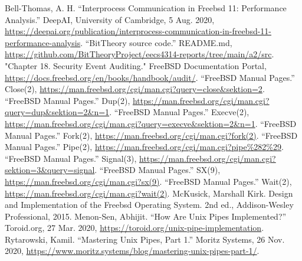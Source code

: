 \documentclass[12pt, dvipsnames, a4paper]{article}
\begin{document}
\begin{thebibliography}{00}
	 Bell-Thomas, A. H. “Interprocess Communication in Freebsd 11: Performance Analysis.” DeepAI, University of Cambridge, 5 Aug. 2020, \href{https://deepai.org/publication/interprocess-communication-in-freebsd-11-performance-analysis}{https://deepai.org/publication/interprocess-communication-in-freebsd-11-performance-analysis}.
	 “BitTheory source code.” README.md, \href{https://github.com/BitTheoryProject/eecs4314-reports/tree/main/a2/src}{https://github.com/BitTheoryProject/eecs4314-reports/tree/main/a2/src}.
	 "Chapter 18. Security Event Auditing." FreeBSD Documentation Portal, \href{https://docs.freebsd.org/en/books/handbook/audit/}{https://docs.freebsd.org/en/books/handbook/audit/}.
	 “FreeBSD Manual Pages.” Close(2), \href{https://man.freebsd.org/cgi/man.cgi?query=close\&sektion=2}{https://man.freebsd.org/cgi/man.cgi?query=close\&sektion=2}.
	 “FreeBSD Manual Pages.” Dup(2), \href{https://man.freebsd.org/cgi/man.cgi?query=dup\&sektion=2\&n=1}{https://man.freebsd.org/cgi/man.cgi?query=dup\&sektion=2\&n=1}.
	 “FreeBSD Manual Pages.” Execve(2), \href{https://man.freebsd.org/cgi/man.cgi?query=execve\&sektion=2\&n=1}{https://man.freebsd.org/cgi/man.cgi?query=execve\&sektion=2\&n=1}.
	 “FreeBSD Manual Pages.” Fork(2), \href{https://man.freebsd.org/cgi/man.cgi?fork(2)}{https://man.freebsd.org/cgi/man.cgi?fork(2)}.
	 “FreeBSD Manual Pages.” Pipe(2), \href{https://man.freebsd.org/cgi/man.cgi?pipe\%282\%29}{https://man.freebsd.org/cgi/man.cgi?pipe\%282\%29}.
	 “FreeBSD Manual Pages.” Signal(3), \href{https://man.freebsd.org/cgi/man.cgi?sektion=3\&query=signal}{https://man.freebsd.org/cgi/man.cgi?sektion=3\&query=signal}.
	 “FreeBSD Manual Pages.” SX(9), \href{https://man.freebsd.org/cgi/man.cgi?sx(9)}{https://man.freebsd.org/cgi/man.cgi?sx(9)}.
	 “FreeBSD Manual Pages.” Wait(2), \href{https://man.freebsd.org/cgi/man.cgi?wait(2)}{https://man.freebsd.org/cgi/man.cgi?wait(2)}.
	 McKusick, Marshall Kirk. Design and Implementation of the Freebsd Operating System. 2nd ed., Addison-Wesley Professional, 2015.
	 Menon-Sen, Abhijit. “How Are Unix Pipes Implemented?” Toroid.org, 27 Mar. 2020, \href{https://toroid.org/unix-pipe-implementation}{https://toroid.org/unix-pipe-implementation}.
	Rytarowski, Kamil. “Mastering Unix Pipes, Part 1.” Moritz Systems, 26 Nov. 2020, \href{https://www.moritz.systems/blog/mastering-unix-pipes-part-1/}{https://www.moritz.systems/blog/mastering-unix-pipes-part-1/}.
\end{thebibliography}
\end{document}
